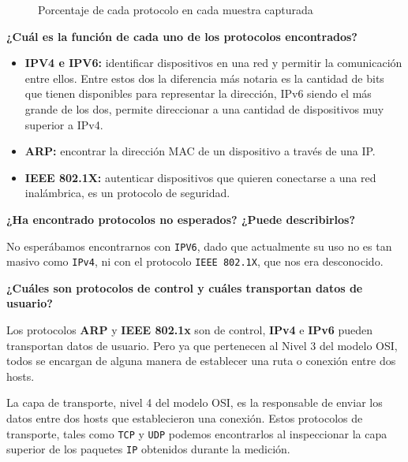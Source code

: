 \begin{figure}[H]
    \vspace{1em}
    \centering
    \caption{Porcentaje de cada protocolo en cada muestra capturada}
    \label{fig: porcentajes protocolos}
\end{figure}

\textbf{¿Cuál es la función de cada uno de los protocolos encontrados?}
\begin{itemize}

    \item \textbf{IPV4 e IPV6:} identificar dispositivos en una red y permitir la comunicación entre ellos. Entre estos dos la diferencia más notaria es la cantidad de bits que tienen disponibles para representar la dirección, IPv6 siendo el más grande de los dos, permite direccionar a una cantidad de dispositivos muy superior a IPv4.

    \item \textbf{ARP:} encontrar la dirección MAC de un dispositivo a través de una IP.
    
    \item \textbf{IEEE 802.1X:} autenticar dispositivos que quieren conectarse a una red inalámbrica, es un protocolo de seguridad.

\end{itemize}

\textbf{¿Ha encontrado protocolos no esperados? ¿Puede describirlos?}

No esperábamos encontrarnos con \texttt{IPV6}, dado que actualmente su uso no es tan masivo como \texttt{IPv4}, ni con el protocolo \texttt{IEEE 802.1X}, que nos era desconocido.

\vspace{4mm}

\textbf{¿Cuáles son protocolos de control y cuáles transportan datos de usuario?} %

Los protocolos \textbf{ARP} y \textbf{IEEE 802.1x} son de control, \textbf{IPv4} e \textbf{IPv6} pueden transportan datos de usuario. Pero ya que pertenecen al Nivel 3 del modelo OSI, todos se encargan de alguna manera de establecer una ruta o conexión entre dos hosts.


La capa de transporte, nivel 4 del modelo OSI, es la responsable de enviar los datos entre dos hosts que establecieron una conexión. Estos protocolos de transporte, tales como \texttt{TCP} y \texttt{UDP} podemos encontrarlos al inspeccionar la capa superior de los paquetes \texttt{IP} obtenidos durante la medición.

